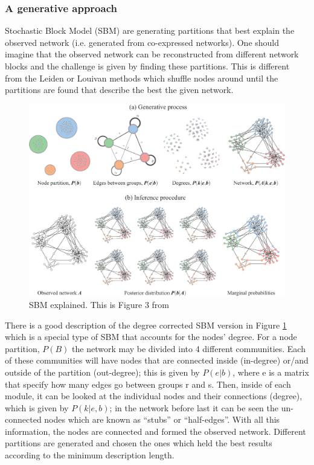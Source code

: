 \subsubsection{A generative approach}


Stochastic Block Model (SBM) are generating partitions that best explain the observed network (i.e. generated from co-expressed networks). One should imagine that the observed network can be reconstructed from different network blocks and the challenge is given by finding these partitions. This is  different from the Leiden or Louivan methods which shuffle nodes around until the partitions are found that describe the best the given network. 

\begin{figure}[!htb]    
    \centering
    \includegraphics[width=1.0\textwidth,height=1.0\textheight,keepaspectratio]{Sections/Network_I/Resources/dc-sbm_explained.png}
    \caption{SBM explained. This is Figure 3 from \citet{Peixoto2021-jx}}
    \label{fig:N_I:dc-sbm_explained}
\end{figure}


There is a good description of the degree corrected SBM version in Figure \ref{fig:N_I:dc-sbm_explained} which is a special type of SBM that accounts for the nodes' degree. For a node partition, $P(B)$ the network may be divided into 4 different communities. Each of these communities will have nodes that are connected inside (in-degree) or/and outside of the partition (out-degree); this is given by $P(e|b)$, where e is a matrix that specify how many edges go between groups r and s. Then, inside of each module, it can be looked at the individual nodes and their connections (degree), which is given by $ P(k|e,b)$; in the network before last it can be seen the un-connected nodes which are known as “stubs” or “half-edges”. With all this information, the nodes are connected and formed the observed network. Different partitions are generated and chosen the ones which held the best results according to the minimum description length.


